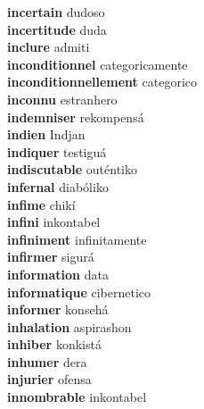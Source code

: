 \textbf{incertain } dudoso \\
\textbf{incertitude } duda \\
\textbf{inclure } admiti \\
\textbf{inconditionnel } categoricamente \\
\textbf{inconditionnellement } categorico \\
\textbf{inconnu } estranhero \\
\textbf{indemniser } rekompensá \\
\textbf{indien } Indjan \\
\textbf{indiquer } testiguá \\
\textbf{indiscutable } outéntiko \\
\textbf{infernal } diabóliko \\
\textbf{infime } chikí \\
\textbf{infini } inkontabel \\
\textbf{infiniment } infinitamente \\
\textbf{infirmer } sigurá \\
\textbf{information } data \\
\textbf{informatique } cibernetico \\
\textbf{informer } konsehá \\
\textbf{inhalation } aspirashon \\
\textbf{inhiber } konkistá \\
\textbf{inhumer } dera \\
\textbf{injurier } ofensa \\
\textbf{innombrable } inkontabel \\
